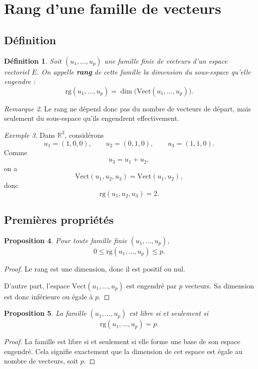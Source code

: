 \documentclass[11pt,a4paper]{article}
\newtheorem{definition}{Définition}[section]
\newtheorem{proposition}[definition]{Proposition}
\theoremstyle{remark}
\newtheorem{remarque}[definition]{Remarque}
\newtheorem{exemple}[definition]{Exemple}
\newcommand{\R}{\mathbb{R}}
\newcommand{\Vect}{\mathrm{Vect}}
\newcommand{\rg}{\mathrm{rg}}
\begin{document}
\section{Rang d’une famille de vecteurs}

\subsection{Définition}

\begin{definition}
Soit \((u_1,\dots,u_p)\) une famille finie de vecteurs d’un espace vectoriel \(E\).  
On appelle \textbf{rang} de cette famille la dimension du sous-espace qu’elle engendre :
\[
\rg(u_1,\dots,u_p)=\dim\big(\Vect(u_1,\dots,u_p)\big).
\]
\end{definition}

\begin{remarque}
Le rang ne dépend donc pas du nombre de vecteurs de départ, mais seulement du sous-espace qu’ils engendrent effectivement.
\end{remarque}

\begin{exemple}
Dans \(\R^3\), considérons
\[
u_1=(1,0,0),\qquad u_2=(0,1,0),\qquad u_3=(1,1,0).
\]
Comme
\[
u_3=u_1+u_2,
\]
on a
\[
\Vect(u_1,u_2,u_3)=\Vect(u_1,u_2),
\]
donc
\[
\rg(u_1,u_2,u_3)=2.
\]
\end{exemple}

\subsection{Premières propriétés}

\begin{proposition}
Pour toute famille finie \((u_1,\dots,u_p)\),
\[
0\le \rg(u_1,\dots,u_p)\le p.
\]
\end{proposition}

\begin{proof}
Le rang est une dimension, donc il est positif ou nul.

D’autre part, l’espace \(\Vect(u_1,\dots,u_p)\) est engendré par \(p\) vecteurs. Sa dimension est donc inférieure ou égale à \(p\).
\end{proof}

\begin{proposition}
La famille \((u_1,\dots,u_p)\) est libre si et seulement si
\[
\rg(u_1,\dots,u_p)=p.
\]
\end{proposition}

\begin{proof}
La famille est libre si et seulement si elle forme une base de son espace engendré. Cela signifie exactement que la dimension de cet espace est égale au nombre de vecteurs, soit \(p\).
\end{proof}
\end{document}
